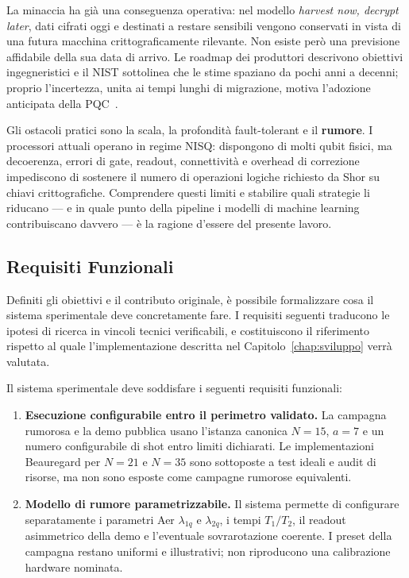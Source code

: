 \begin{onehalfspace}
La minaccia ha già una conseguenza operativa: nel modello \textit{harvest now, decrypt later}, dati cifrati oggi e destinati a restare sensibili vengono conservati in vista di una futura macchina crittograficamente rilevante. Non esiste però una previsione affidabile della sua data di arrivo. Le roadmap dei produttori descrivono obiettivi ingegneristici e il \ac{NIST} sottolinea che le stime spaziano da pochi anni a decenni; proprio l'incertezza, unita ai tempi lunghi di migrazione, motiva l'adozione anticipata della \ac{PQC}~\cite{nist_pqc_explainer2026,ibm_roadmap2025}.

Gli ostacoli pratici sono la scala, la profondità fault-tolerant e il \textbf{rumore}. I processori attuali operano in regime \ac{NISQ}: dispongono di molti qubit fisici, ma decoerenza, errori di gate, readout, connettività e overhead di correzione impediscono di sostenere il numero di operazioni logiche richiesto da Shor su chiavi crittografiche. Comprendere questi limiti e stabilire quali strategie li riducano --- e in quale punto della pipeline i modelli di machine learning contribuiscano davvero --- è la ragione d'essere del presente lavoro.

\subsection{Requisiti Funzionali}
\label{sec:requisiti}

Definiti gli obiettivi e il contributo originale, è possibile formalizzare cosa il sistema sperimentale deve concretamente fare. I requisiti seguenti traducono le ipotesi di ricerca in vincoli tecnici verificabili, e costituiscono il riferimento rispetto al quale l'implementazione descritta nel Capitolo~\ref{chap:sviluppo} verrà valutata.

Il sistema sperimentale deve soddisfare i seguenti requisiti funzionali:

\begin{enumerate}

    \item \textbf{Esecuzione configurabile entro il perimetro validato.}
    La campagna rumorosa e la demo pubblica usano l'istanza canonica $N=15$, $a=7$ e un numero configurabile di shot entro limiti dichiarati. Le implementazioni Beauregard per $N=21$ e $N=35$ sono sottoposte a test ideali e audit di risorse, ma non sono esposte come campagne rumorose equivalenti.

    \item \textbf{Modello di rumore parametrizzabile.}
    Il sistema permette di configurare separatamente i parametri Aer $\lambda_{1q}$ e $\lambda_{2q}$, i tempi $T_1/T_2$, il readout asimmetrico della demo e l'eventuale sovrarotazione coerente. I preset della campagna restano uniformi e illustrativi; non riproducono una calibrazione hardware nominata.


\end{enumerate}
\end{onehalfspace}
